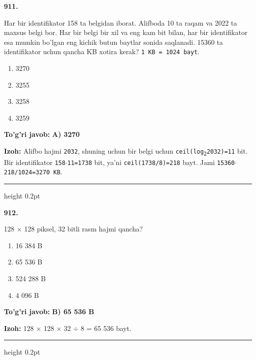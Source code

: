 \documentclass[10pt,a4paper,oneside]{article}
\begin{document}
\noindent\textbf{\color{ink}911.}
\par
Har bir identifikator 158 ta belgidan iborat. Alifboda 10 ta raqam va 2022 ta maxsus belgi bor. Har bir belgi bir xil va eng kam bit bilan, har bir identifikator esa mumkin bo'lgan eng kichik butun baytlar sonida saqlanadi. 15360 ta identifikator uchun qancha KB xotira kerak? \texttt{1 KB = 1024 bayt}.
\begin{enumerate}[label=\Alph*),leftmargin=9mm]
\item 3270
\item 3255
\item 3258
\item 3259
\end{enumerate}
\begin{tcolorbox}[enhanced,breakable,colback=teal!4,colframe=teal!50!black,boxrule=0.5pt,arc=1.1mm,left=3mm,right=3mm,top=1.7mm,bottom=1.7mm,before skip=2mm,after skip=2mm]
\textbf{\color{teal}To'g'ri javob:} \textbf{A) 3270}
\par\smallskip
\textbf{Izoh:} Alifbo hajmi \texttt{2032}, shuning uchun bir belgi uchun \texttt{ceil(log\textsubscript{2}2032)=11} bit. Bir identifikator \texttt{158\ensuremath{\cdot}11=1738} bit, ya'ni \texttt{ceil(1738/8)=218} bayt. Jami \texttt{15360\ensuremath{\cdot}218/1024=3270 KB}.
\end{tcolorbox}
\vspace{2mm}\hrule height 0.2pt \vspace{3mm}

\noindent\textbf{\color{ink}912.}
\par
128 \ensuremath{\times} 128 piksel, 32 bitli rasm hajmi qancha?
\begin{enumerate}[label=\Alph*),leftmargin=9mm]
\item 16 384 B
\item 65 536 B
\item 524 288 B
\item 4 096 B
\end{enumerate}
\begin{tcolorbox}[enhanced,breakable,colback=teal!4,colframe=teal!50!black,boxrule=0.5pt,arc=1.1mm,left=3mm,right=3mm,top=1.7mm,bottom=1.7mm,before skip=2mm,after skip=2mm]
\textbf{\color{teal}To'g'ri javob:} \textbf{B) 65 536 B}
\par\smallskip
\textbf{Izoh:} 128 \ensuremath{\times} 128 \ensuremath{\times} 32 \ensuremath{\div} 8 = 65 536 bayt.
\end{tcolorbox}
\vspace{2mm}\hrule height 0.2pt \vspace{3mm}
\end{document}
